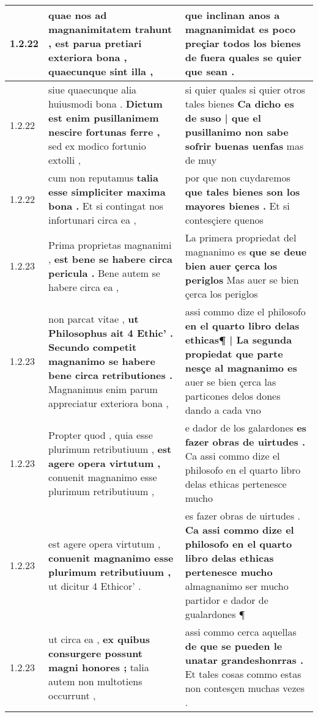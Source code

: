 \begin{tabular}{|p{1cm}|p{6.5cm}|p{6.5cm}|}
1.2.22 & quae nos ad magnanimitatem trahunt , \textbf{ est parua pretiari exteriora bona , } quaecunque sint illa , & que inclinan anos a magnanimidat \textbf{ es poco preçiar todos los bienes } de fuera quales se quier que sean . \\\hline
1.2.22 & siue quaecunque alia huiusmodi bona . \textbf{ Dictum est enim pusillanimem nescire fortunas ferre , } sed ex modico fortunio extolli , & si quier quales si quier otros tales bienes \textbf{ Ca dicho es de suso | que el pusillanimo non sabe sofrir buenas uenfas } mas de muy \\\hline
1.2.22 & cum non reputamus \textbf{ talia esse simpliciter maxima bona . } Et si contingat nos infortunari circa ea , & por que non cuydaremos \textbf{ que tales bienes son los mayores bienes . } Et si contesçiere quenos \\\hline
1.2.23 & Prima proprietas magnanimi , \textbf{ est bene se habere circa pericula . } Bene autem se habere circa ea , & La primera propriedat del magnanimo es \textbf{ que se deue bien auer çerca los periglos } Mas auer se bien çerca los periglos \\\hline
1.2.23 & non parcat vitae , \textbf{ ut Philosophus ait 4 Ethic’ . Secundo competit magnanimo se habere bene circa retributiones . } Magnanimus enim parum appreciatur exteriora bona , & assi commo dize el philosofo \textbf{ en el quarto libro delas ethicas¶ | La segunda propiedat que parte nesçe al magnanimo es } auer se bien çerca las particones delos dones dando a cada vno \\\hline
1.2.23 & Propter quod , quia esse plurimum retributiuum , \textbf{ est agere opera virtutum , } conuenit magnanimo esse plurimum retributiuum , & e dador de los galardones \textbf{ es fazer obras de uirtudes . } Ca assi commo dize el philosofo en el quarto libro delas ethicas pertenesce mucho \\\hline
1.2.23 & est agere opera virtutum , \textbf{ conuenit magnanimo esse plurimum retributiuum , } ut dicitur 4 Ethicor’ . & es fazer obras de uirtudes . \textbf{ Ca assi commo dize el philosofo en el quarto libro delas ethicas pertenesce mucho } almagnanimo ser mucho partidor e dador de gualardones ¶ \\\hline
1.2.23 & ut circa ea , \textbf{ ex quibus consurgere possunt magni honores ; } talia autem non multotiens occurrunt , & assi commo cerca aquellas \textbf{ de que se pueden le unatar grandeshonrras . } Et tales cosas commo estas non contesçen muchas vezes . \\\hline

\end{tabular}
